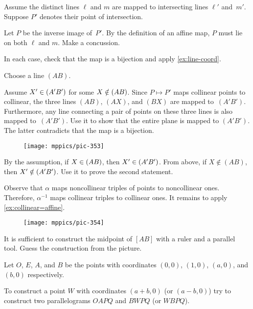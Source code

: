 Assume the distinct lines $\ell$ and $m$ 
are mapped to intersecting lines $\ell'$ and~$m'$.
Suppose $P'$ denotes their point of intersection.

Let $P$ be the inverse image of~$P'$.
By the definition of an affine map, $P$ must lie on both $\ell$ and $m$.
Make a concussion.

In each case, check that the map is a bijection and apply \ref{ex:line-coord}.

Choose a line $(AB)$.

Assume $X'\in (A'B')$ for some $X\notin(AB)$.
Since $P\mapsto P'$ maps collinear points to collinear, 
the three lines $(AB)$, $(AX)$, and $(BX)$ are mapped to~$(A'B')$.
Furthermore, any line connecting a pair of points on these three lines is also mapped to~$(A'B')$.
Use it to show that the entire plane is mapped to $(A'B')$.
The latter contradicts that the map is a bijection.

{

\begin{wrapfigure}{r}{22mm}
\vskip-2mm
\centering
\texttt{[image: mppics/pic-353]}
\end{wrapfigure}

By the assumption, if $X\in (AB)$, then $X'\in (A'B')$.
From above, if $X\notin (AB)$, then $X'\notin (A'B')$.
Use it to prove the second statement.

}

Observe that $\alpha$ maps noncollinear triples of points to noncollinear ones.
Therefore, $\alpha^{-1}$ maps collinear triples to collinear ones.
It remains to apply \ref{ex:collinear=affine}.

{

\begin{wrapfigure}{r}{28mm}
\vskip-6mm
\centering
\texttt{[image: mppics/pic-354]}
\end{wrapfigure}

It is sufficient to construct the midpoint of $[AB]$
with a ruler and a parallel tool.
Guess the construction from the picture.

}

Let $O$, $E$, $A$, and $B$ be the points with coordinates $(0,0)$, $(1,0)$, $(a,0)$, and $(b,0)$ respectively.

To construct a point $W$ with coordinates $(a+b,0)$ (or $(a-b,0)$) try to construct two parallelograms $OAPQ$ and $BWPQ$ (or $WBPQ$).

